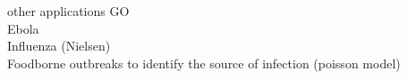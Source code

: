 \documentclass[table]{beamer}\usepackage[]{graphicx}\usepackage[]{color}
\begin{document}
% 
% 
% 


\begin{frame}[fragile]{other applications}
GO \\
Ebola \\

Influenza (Nielsen) \cite{nielsen2019} \\
Foodborne outbreaks to identify the source of infection (poisson model)

\end{frame}
\end{document}
